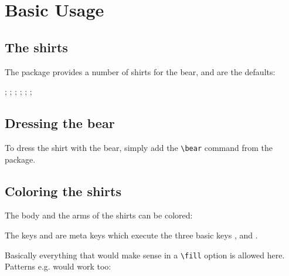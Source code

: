 \section{Basic Usage}
\subsection{The shirts}
 The package provides a number of shirts for the bear,  and  are the defaults:
 \begin{tcblisting}{} 
 \tikz{};
 \tikz\bearwear
   [t-shirt];
 \tikz{};
 \tikz\bearwear
   [v-neckline];
 \tikz{};
 \tikz{};
  \end{tcblisting}
  
 \subsection{Dressing the bear}
 
 To dress the shirt with the bear, simply add the \verb+\bear+ command from the  package.
 
 \begin{tcblisting}{}
 \tikz{\bear;\bearwear[v-neckline];}
  \end{tcblisting}
  
 \subsection{Coloring the shirts}

 The body and the arms of the shirts can be colored:

 \begin{tcblisting}{}
 \tikz{\bear;
       \bearwear
       [v-neckline,
       leftarm=red,body=blue,rightarm=green];}
 \tikz{\bear;\bearwear[arms=green];}
 \tikz{\bear;
       \bearwear
         [shirt=
           {shade,
            top color=blue, 
            bottom color=red}];}
 \end{tcblisting} 
 
 The keys  and  are meta keys which execute the three basic keys ,  and .
 
 Basically everything that would make sense in a \verb+\fill+ option is allowed here.  Patterns e.g. would work too:
 
